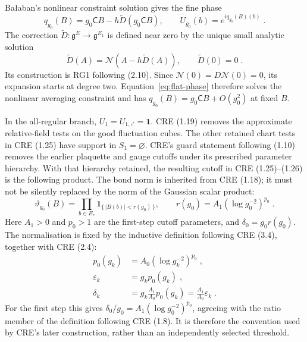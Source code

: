 \documentclass[11pt]{article}
\newcommand{\id}{\mathbf 1}
\begin{document}
Ba{\l}aban's nonlinear constraint solution gives the fine phase
\begin{equation}\label{eq:flat-phase}
    q_{g_0}(B)=g_0\mathsf C B-h\widetilde D(g_0\mathsf C B),
    \qquad U_{g_0}(b)=e^{iq_{g_0}(B)(b)}\;.
\end{equation}
The correction $\widetilde D \colon \mathfrak g^E\to\mathfrak g^{E_1}$ is defined near zero by the unique small analytic solution
\begin{equation}
    \widetilde D(A)=\mathcal N(A-h\widetilde D(A)),
    \qquad \widetilde D(0)=0\;.
\end{equation}
Its construction is RG1 following (2.10). Since $\mathcal N(0)=D\mathcal N(0)=0$, its expansion starts at degree two. Equation~\eqref{eq:flat-phase} therefore solves the nonlinear averaging constraint and has $q_{g_0}(B)=g_0\mathsf C B+O(g_0^2)$ at fixed $B$.

In the all-regular branch, $U_1=U_{1,\square'}=\id$. CRE (1.19) removes the approximate relative-field tests on the good fluctuation cubes. The other retained chart tests in CRE (1.25) have support in $S_1=\varnothing$. CRE's guard statement following (1.10) removes the earlier plaquette and gauge cutoffs under its prescribed parameter hierarchy. With that hierarchy retained, the resulting cutoff in CRE (1.25)--(1.26) is the following product. The bond norm is inherited from CRE (1.18); it must not be silently replaced by the norm of the Gaussian scalar product:
\begin{equation}\label{eq:literal-cutoff}
    \vartheta_{g_0}(B)=\prod_{b\in E_*}
        \mathbf 1_{\{\,|B(b)|<r(g_0)\,\}},
    \qquad r(g_0)=A_1(\log g_0^{-2})^{p_0}\;.
\end{equation}
Here $A_1>0$ and $p_0>1$ are the first-step cutoff parameters, and $\delta_0=g_0r(g_0)$. The normalisation is fixed by the inductive definition following CRE (3.4), together with CRE (2.4):
\begin{equation}\label{eq:cre-cutoff-normalisation}
    \begin{aligned}
        p_0(g_k)&=A_0(\log g_k^{-2})^{p_0}\;,\\
        \varepsilon_k&=g_kp_0(g_k)\;,\\
        \delta_k&=g_k\frac{A_1}{A_0}p_0(g_k)
            =\frac{A_1}{A_0}\varepsilon_k\;.
    \end{aligned}
\end{equation}
For the first step this gives $\delta_0/g_0=A_1(\log g_0^{-2})^{p_0}$, agreeing with the ratio member of the definition following CRE (1.8). It is therefore the convention used by CRE's later construction, rather than an independently selected threshold.
\end{document}
